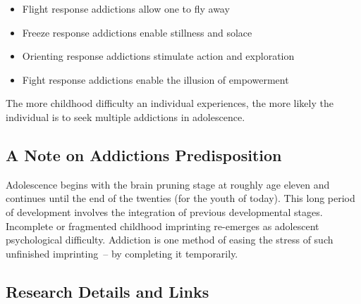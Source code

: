 \documentclass[12pt,DIV9,oneside,headsepline,footsepline]{scrreprt}
\begin{document}
\begin{itemize}

\item Flight response addictions allow one to fly away
\item Freeze response addictions enable stillness and solace 
\item Orienting response addictions stimulate action and exploration 
\item Fight response addictions enable the illusion of empowerment
\end{itemize}

The more childhood difficulty an individual experiences, the more
likely the individual is to seek multiple addictions in adolescence.

\subsection{A Note on Addictions Predisposition}

Adolescence begins with the brain pruning stage at roughly age eleven
and continues until the end of the twenties (for the youth of today).
This long period of development involves the integration of previous
developmental stages. Incomplete or fragmented childhood imprinting
re-emerges as adolescent psychological difficulty. Addiction is one
method of easing the stress of such unfinished imprinting~-- by
completing it temporarily. 

\subsection{Research Details and Links}
\end{document}
